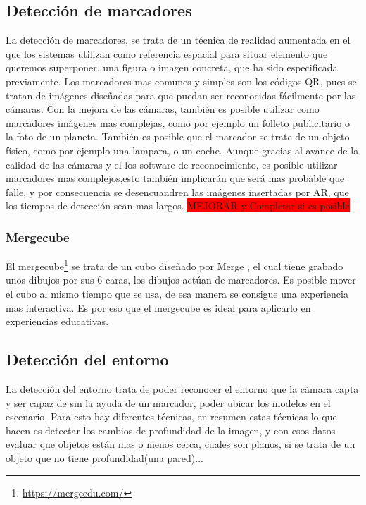 	\subsection{Detección de marcadores}
	La detección de marcadores, se trata de un técnica de realidad aumentada en el que los sistemas utilizan como referencia espacial para situar elemento que queremos superponer, una figura o imagen concreta, que ha sido especificada previamente. Los marcadores mas comunes y simples son los códigos QR, pues se tratan de imágenes diseñadas para que puedan ser reconocidas fácilmente por las cámaras.
	Con la mejora de las cámaras, también es posible utilizar como marcadores imágenes mas complejas, como por ejemplo un folleto publicitario o la foto de un planeta.
	También es posible que el marcador se trate de un objeto físico, como por ejemplo una lampara, o un coche.
	Aunque gracias al avance de la calidad de las cámaras y el los software de reconocimiento, es posible utilizar marcadores mas complejos,esto también implicarán que será mas probable que falle, y por consecuencia se desencuandren las imágenes insertadas por AR, que los tiempos de detección sean mas largos.
	\colorbox{red}{MEJORAR y Completar si es posible}
	
	\subsubsection{Mergecube}
	El mergecube\footnote{\url{https://mergeedu.com/}} se trata de un cubo diseñado por Merge , el cual tiene grabado unos dibujos por sus 6 caras, los dibujos actúan de marcadores. Es posible mover el cubo al mismo tiempo que se usa, de esa manera se consigue una experiencia mas interactiva. Es por eso que el mergecube es ideal para aplicarlo en experiencias educativas.
	\subsection{Detección del entorno}
	La detección del entorno trata de poder reconocer el entorno que la cámara capta y ser capaz de sin la ayuda de un marcador, poder ubicar los modelos en el escenario.
	Para esto hay diferentes técnicas, en resumen estas técnicas lo que hacen es detectar los cambios de profundidad de la imagen, y con esos datos evaluar que objetos están mas o menos cerca, cuales son planos, si se trata de un objeto que no tiene profundidad(una pared)...
